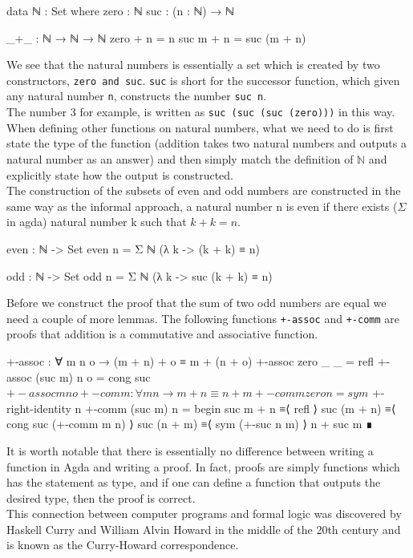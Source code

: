 \documentclass[11pt,a4paper]{article}
\begin{document}
\begin{code}
data ℕ : Set where
  zero : ℕ
  suc  : (n : ℕ) → ℕ

_+_ : ℕ → ℕ → ℕ
zero  + n = n
suc m + n = suc (m + n)
\end{code}

We see that the natural numbers is essentially a set which is created by two constructors, \texttt{zero and suc}. \texttt{suc} is short for the successor function, which given any natural number \texttt{n}, constructs the number \texttt{suc n}. \\
The number 3 for example, is written as \texttt{suc (suc (suc (zero)))} in this way. When defining other functions on natural numbers, what we need to do is first state the type of the function (addition takes two natural numbers and outputs a natural number as an answer) and then simply match the definition of $\mathbb{N}$ and explicitly state how the output is constructed.\\
The construction of the subsets of even and odd numbers are constructed in the same way as the informal approach, a natural number n is even if there exists ($\Sigma$ in agda) natural number k such that $k + k = n$.
\begin{code}
even : ℕ -> Set
even n = Σ ℕ (λ k -> (k + k) ≡ n)
 
odd : ℕ -> Set
odd n = Σ ℕ (λ k -> suc (k + k) ≡ n)
\end{code}
Before we construct the proof that the sum of two odd numbers are equal we need a couple of more lemmas. The following functions \texttt{+-assoc} and \texttt{+-comm} are proofs that addition is a commutative and associative function. \\
\begin{code}
+-assoc : ∀ m n o → (m + n) + o ≡ m + (n + o)
+-assoc zero    _ _ = refl
+-assoc (suc m) n o = cong suc $ +-assoc m n o

+-comm : ∀ m n → m + n ≡ n + m
+-comm zero    n = sym $ +-right-identity n
+-comm (suc m) n =
  begin
    suc m + n
  ≡⟨ refl ⟩
    suc (m + n)
  ≡⟨ cong suc (+-comm m n) ⟩
    suc (n + m)
  ≡⟨ sym (+-suc n m) ⟩
    n + suc m
  ∎
\end{code}
It is worth notable that there is essentially no difference between writing a function in Agda and writing a proof. In fact, proofs are simply functions which has the statement as type, and if one can define a function that outputs the desired type, then the proof is correct.\\
This connection between computer programs and formal logic was discovered by Haskell Curry and William Alvin Howard in the middle of the 20th century and is known as the Curry-Howard correspondence.\\
\end{document}
